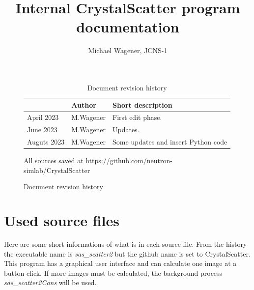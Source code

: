 \documentclass[11pt]{article} %
\author{Michael Wagener, JCNS-1}
\title{Internal CrystalScatter program documentation}
\begin{document}
\maketitle
\tableofcontents %

\begin{figure}[b] %
\begin{longtable}{|p{2.7cm}|p{2.6cm}|p{10.3cm}|}
\caption{Document revision history} \\
\hline\rowcolor{rowcolor}{\bf Date} & {\bf Author} & {\bf Short description} \\
\endfirsthead
\hline
April 2023 & M.Wagener & First edit phase. \\ \hline
June 2023 & M.Wagener & Updates. \\ \hline
Auguts 2023 & M.Wagener & Some updates and insert Python code \\ \hline
\end{longtable}

\centerline{All sources saved at https://github.com/neutron-simlab/CrystalScatter}
\end{figure}

\clearpage %


\section{Used source files}

Here are some short informations of what is in each source file. From the history the executable name is {\it sas\_scatter2} but the github name is set to CrystalScatter. This program has a graphical user interface and can calculate one image at a button click. If more images must be calculated, the background process {\it sas\_scatter2Cons} will be used.
\end{document}
